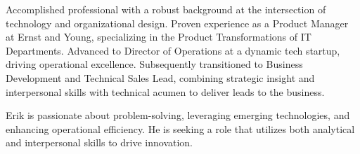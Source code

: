 

\begin{cvparagraph}

Accomplished professional with a robust background at the intersection of technology and organizational design. Proven experience as a Product Manager at Ernst and Young, specializing in the Product Transformations of IT Departments. Advanced to Director of Operations at a dynamic tech startup, driving operational excellence. Subsequently transitioned to Business Development and Technical Sales Lead, combining strategic insight and interpersonal skills with technical acumen to deliver leads to the business. 

Erik is passionate about problem-solving, leveraging emerging technologies, and enhancing operational efficiency. He is seeking a role that utilizes both analytical and interpersonal skills to drive innovation.
\end{cvparagraph}
